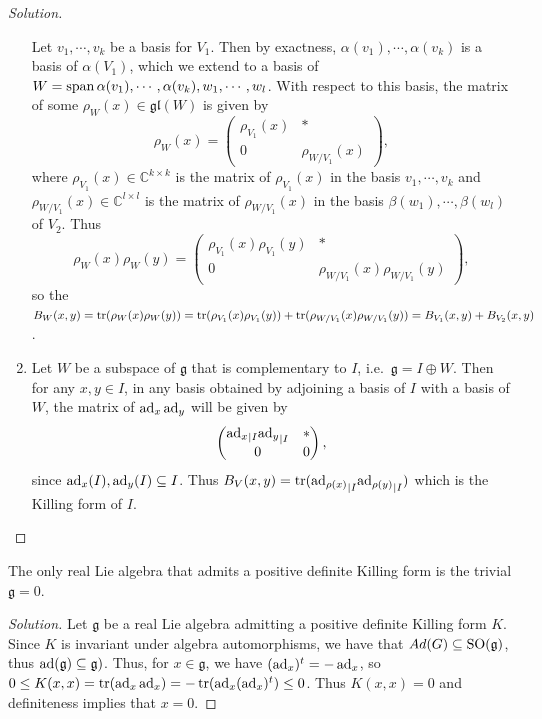 \documentclass{report}
\begin{document}
\begin{proof}[Solution]
\begin{enumerate}[label = (\roman*)]
    Let $v_1, \cdots, v_k$ be a basis for $V_1$.
    Then by exactness, $\alpha(v_1), \cdots, \alpha(v_k)$ is a basis of $\alpha(V_1)$, which we extend to a basis of $W = \operatorname{span}{\alpha(v_1), \cdots, \alpha(v_k), w_1, \cdots, w_l}$.
    With respect to this basis, the matrix of some $\rho_W(x) \in \mathfrak{gl}(W)$ is given by
    \[
    \rho_W(x) = 
    \begin{pmatrix}
        \rho_{V_1}(x) & *\\
        0 & \rho_{W/V_1}(x)
    \end{pmatrix},
    \]
    where $\rho_{V_1}(x) \in \mathbb C^{k \times k}$ is the matrix of $\rho_{V_1}(x)$ in the basis $v_1, \cdots, v_k$ and $\rho_{W/V_1}(x) \in \mathbb C^{l \times l}$ is the matrix of $\rho_{W/V_1}(x)$ in the basis $\beta(w_1), \cdots, \beta(w_l)$ of $V_2$.
    Thus
    \[
    \rho_W(x)\rho_W(y) = 
    \begin{pmatrix}
        \rho_{V_1}(x) \rho_{V_1}(y) & *\\
        0 & \rho_{W/V_1}(x)\rho_{W/V_1}(y)
    \end{pmatrix},
    \]
    so the $B_W(x, y) = \operatorname{tr}(\rho_W(x)\rho_W(y)) = \operatorname{tr}(\rho_{V_1}(x)\rho_{V_1}(y)) + \operatorname{tr}(\rho_{W/V_1}(x)\rho_{W/V_1}(y)) = B_{V_1}(x,y) + B_{V_2}(x,y)$.
    \item 
    Let $W$ be a subspace of $\mathfrak g$ that is complementary to $I$, i.e.\ $\mathfrak g = I \oplus W$.
    Then for any $x,y \in I$, in any basis obtained by adjoining a basis of $I$ with a basis of $W$, the matrix of $\operatorname{ad}_x \operatorname{ad}_y$ will be given by
    \[
    \begin{pmatrix}
        {\operatorname{ad}_x}_{|I} {\operatorname{ad}_y}_{|I} & *\\
        0 & 0
    \end{pmatrix},
    \]
    since $\operatorname{ad}_x(I), \operatorname{ad}_y(I) \subseteq I$.
    Thus $B_V(x,y) = \operatorname{tr}({\operatorname{ad}_{\rho(x)}}_{|I} {\operatorname{ad}_{\rho(y)}}_{|I})$ which is the Killing form of $I$.
    \end{enumerate}
    
\end{proof}

\begin{exercise}[Exercise 5.5]
    The only real Lie algebra that admits a positive definite Killing form is the trivial $\mathfrak g = 0$.
\end{exercise}
\begin{proof}[Solution]
    Let $\mathfrak g$ be a real Lie algebra admitting a positive definite Killing form $K$.
    Since $K$ is invariant under algebra automorphisms, we have that $Ad(G) \subseteq \operatorname{{\mathrm{SO}}}(\mathfrak g)$, thus $\ad(\mathfrak g) \subseteq \so(\mathfrak g)$.
    Thus, for $x \in \mathfrak g$, we have $(\operatorname{ad}_x)^t = -\operatorname{ad}_x$, so $0 \leq K(x,x) = \operatorname{tr}(\operatorname{ad}_x \operatorname{ad}_x) = - \operatorname{tr}(\operatorname{ad}_x (\operatorname{ad}_x)^t) \leq 0 $.
    Thus $K(x,x) = 0 $ and definiteness implies that $x = 0$.
\end{proof}
\end{document}
